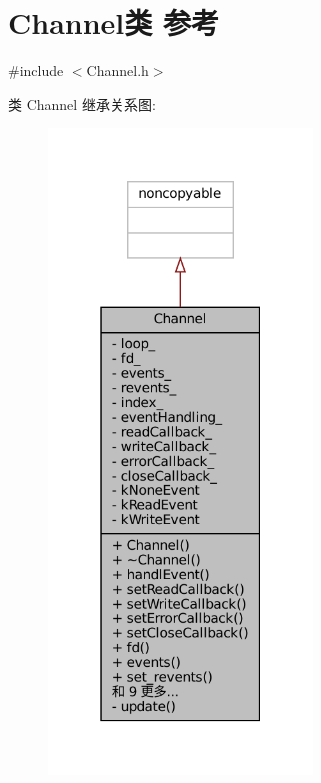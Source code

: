 \hypertarget{classmuduo_1_1Channel}{}\section{Channel类 参考}
\label{classmuduo_1_1Channel}


{\ttfamily \#include $<$Channel.\+h$>$}



类 Channel 继承关系图\+:
\nopagebreak
\begin{figure}[H]
\begin{center}
\leavevmode
\includegraphics[width=199pt]{classmuduo_1_1Channel__inherit__graph}
\end{center}
\end{figure}


